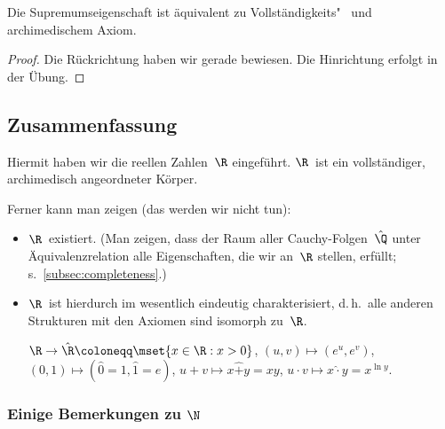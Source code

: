 \documentclass[a4paper]{article}
\begin{document}
\begin{theorem}
    Die Supremumseigenschaft ist äquivalent zu Vollständigkeits"~ und archimedischem Axiom.
\end{theorem}

\begin{proof}
    Die Rückrichtung haben wir gerade bewiesen. Die Hinrichtung erfolgt in der Übung.
\end{proof}

\subsection{Zusammenfassung}

Hiermit haben wir die reellen Zahlen~$\R$ eingeführt. $\R$~ist ein vollständiger, archimedisch angeordneter Körper.

Ferner kann man zeigen (das werden wir nicht tun):
\begin{itemize}
    \item $\R$~existiert. (Man zeigen, dass der Raum aller Cauchy-Folgen~$\hat{\Q}$ unter Äquivalenzrelation alle Eigenschaften, die wir an~$\R$ stellen, erfüllt; s.~\cref{subsec:completeness}.)
    \item $\R$~ist hierdurch im wesentlich eindeutig charakterisiert, d.\,h.\ alle anderen Strukturen mit den Axiomen sind isomorph zu~$\R$.

          \begin{example}
              $\R \to \hat{\R} \coloneqq \mset{x \in \R : x > 0}$, $(u, v) \mapsto (e^u, e^v)$, $(0, 1) \mapsto (\hat{0} = 1, \hat{1} = e)$, $u + v \mapsto x \mathrel{\hat{+}} y = xy$, $u \cdot v \mapsto x \mathrel{\hat{\cdot}} y = x^{\ln y}$.
          \end{example}
\end{itemize}

\subsubsection{Einige Bemerkungen zu \texorpdfstring{$\N$}{N}}
\end{document}
